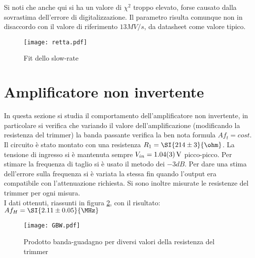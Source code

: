 Si noti che anche qui si ha un valore di $\chi^2$ troppo elevato, forse causato dalla sovrastima dell'errore di digitalizzazione. Il parametro risulta comunque non in disaccordo con il valore di riferimento $13 MV/s$, da datasheet come valore tipico.



\begin{figure}[h]
	\centering
	\texttt{[image: retta.pdf]}
	\caption{Fit dello slow-rate}
	\label{f:RETTA}
\end{figure}


\section{Amplificatore non invertente}

In questa sezione si studia il comportamento dell'amplificatore non invertente, in particolare si verifica che variando il valore dell'amplificazione (modificando la resistenza del trimmer) la banda passante verifica la ben nota formula $Af_t=cost$.\\
Il circuito è stato montato con una resistenza $R_1=\SI{214\pm 3}{\ohm}$. La tensione di ingresso si è mantenuta sempre  $V_{in}=\SI{1.04\pm 0.03}{V}$ picco-picco.
Per stimare la frequenza di taglio si è usato il metodo dei $-3dB$. Per dare una stima dell'errore sulla frequenza si è variata la stessa fin quando l'output era compatibile con l'attenuazione richiesta. Si sono inoltre misurate le resistenze del trimmer per ogni misura. \\
I dati ottenuti, riassunti in figura \ref{f:GBW}, con il risultato:
$Af_H=\SI{2.11\pm 0.05}{\MHz}$

\begin{figure}[h]
	\centering
	\texttt{[image: GBW.pdf]}
	\caption{Prodotto banda-guadagno per diversi valori della resistenza del trimmer}
	\label{f:GBW}
\end{figure}





